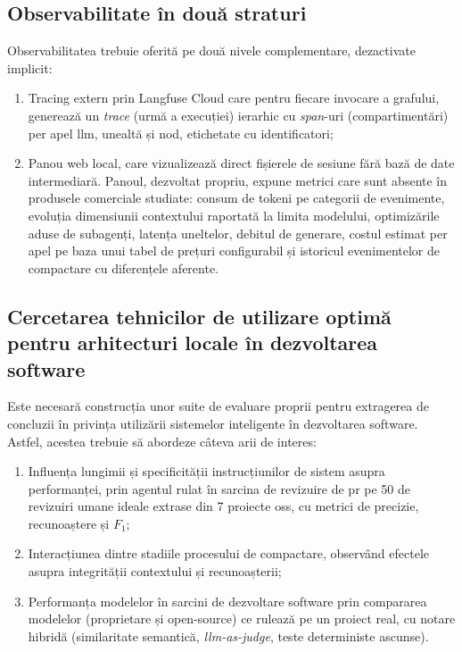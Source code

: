 \documentclass[12pt, a4paper, oneside, romanian]{teza-upb}
\begin{document}
  \subsection{Observabilitate în două straturi}

  Observabilitatea trebuie oferită pe două nivele complementare, dezactivate implicit:
  \begin{enumerate}
    \item Tracing extern prin Langfuse Cloud care pentru fiecare invocare a
  grafului, generează un \textit{trace} (urmă a execuției) ierarhic cu \textit{span}-uri (compartimentări) per apel \ac{llm},
  unealtă și nod, etichetate cu identificatori;
    \item Panou web local, care vizualizează direct fișierele de sesiune
  fără bază de date intermediară. Panoul, dezvoltat propriu, expune metrici care sunt absente în
  produsele comerciale studiate: consum de tokeni pe categorii de evenimente, evoluția
  dimensiunii contextului raportată la limita modelului, optimizările aduse de subagenți, latența uneltelor,
  debitul de generare, costul estimat per apel pe baza unui tabel de prețuri configurabil și
  istoricul evenimentelor de compactare cu diferențele aferente. 
  \end{enumerate}

  \subsection{Cercetarea tehnicilor de utilizare optimă pentru arhitecturi locale în dezvoltarea software}

  Este necesară construcția unor suite de evaluare proprii pentru extragerea de concluzii în privința utilizării sistemelor inteligente în dezvoltarea software. Astfel, acestea trebuie să abordeze câteva arii de interes: 
  
  \begin{enumerate}
    \item Influența lungimii și specificității instrucțiunilor de sistem asupra
  performanței, prin agentul rulat în sarcina de revizuire de \ac{pr} pe 50 de revizuiri umane
  ideale extrase din 7 proiecte \ac{oss}, cu metrici de precizie, recunoaștere și $F_1$;
    \item Interacțiunea dintre stadiile procesului de compactare, observând
  efectele asupra integrității contextului și recunoașterii; 
    \item Performanța modelelor în sarcini de dezvoltare software prin compararea modelelor
  (proprietare și open-source) ce rulează pe un proiect real, cu notare hibridă (similaritate semantică,
  \emph{\ac{llm}-as-judge}, teste deterministe ascunse).
  \end{enumerate}
\end{document}

